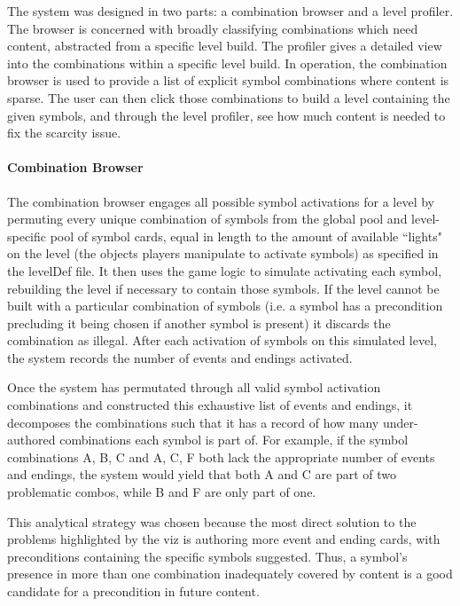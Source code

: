 The system was designed in two parts: a combination browser and a level profiler. The browser is concerned with broadly classifying combinations which need content, abstracted from a specific level build. The profiler gives a detailed view into the combinations within a specific level build. In operation, the combination browser is used to provide a list of explicit symbol combinations where content is sparse. The user can then click those combinations to build a level containing the given symbols, and through the level profiler, see how much content is needed to fix the scarcity issue.

\paragraph{Combination Browser}\label{par:icebound-combination-browser}

The combination browser engages all possible symbol activations for a level by permuting every unique combination of symbols from the global pool and level-specific pool of symbol cards, equal in length to the amount of available ``lights" on the level (the objects players manipulate to activate symbols) as specified in the levelDef file. It then uses the game logic to simulate activating each symbol, rebuilding the level if necessary to contain those symbols. If the level cannot be built with a particular combination of symbols (i.e. a symbol has a precondition precluding it being chosen if another symbol is present) it discards the combination as illegal. After each activation of symbols on this simulated level, the system records the number of events and endings activated.

Once the system has permutated through all valid symbol activation combinations and constructed this exhaustive list of events and endings, it decomposes the combinations such that it has a record of how many under-authored combinations each symbol is part of. For example, if the symbol combinations A, B, C and A, C, F both lack the appropriate number of events and endings, the system would yield that both A and C are part of two problematic combos, while B and F are only part of one.

This analytical strategy was chosen because the most direct solution to the problems highlighted by the viz is authoring more event and ending cards, with preconditions containing the specific symbols suggested. Thus, a symbol's presence in more than one combination inadequately covered by content is a good candidate for a precondition in future content.


